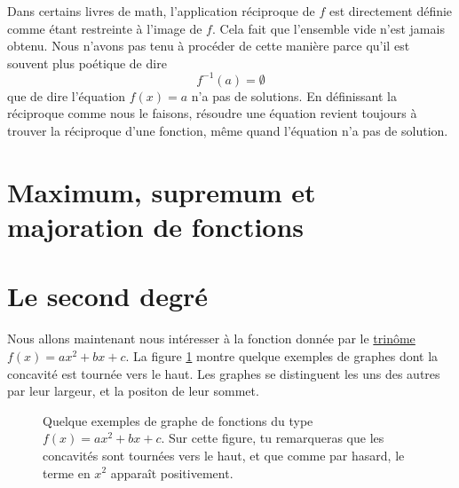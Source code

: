 \begin{remark}
Dans certains livres de math, l'application réciproque de $f$ est directement définie comme étant restreinte à l'image de $f$. Cela fait que l'ensemble vide n'est jamais obtenu. Nous n'avons pas tenu à procéder de cette manière parce qu'il est souvent plus poétique de dire 
\[ 
  f^{-1}(a)=\emptyset
\]
que de dire \og l'équation $f(x)=a$ n'a pas de solutions\fg. En définissant la réciproque comme nous le faisons, résoudre une équation revient toujours à trouver la réciproque d'une fonction, même quand l'équation n'a pas de solution.
\end{remark}


\section{Maximum, supremum et majoration de fonctions}

\section{Le second degré}

Nous allons maintenant nous intéresser à la fonction donnée par le \href{http://fr.wikiversity.org/wiki/Cours_de_mathématiques_de_première_STI/Fonctions_polynômes_du_second_degré_(ou_trinômes)}{trinôme} $f(x)=ax^2+bx+c$. La figure \ref{figExposi} montre quelque exemples de graphes dont la concavité est tournée vers le haut. Les graphes se distinguent les uns des autres par leur largeur, et la positon de leur sommet.

\begin{figure}[ht]
\centering
{}
%
%
\caption{Quelque exemples de graphe de fonctions du type $f(x)=ax^2+bx+c$. Sur cette figure, tu remarqueras que les concavités sont tournées vers le haut, et que comme par hasard, le terme en $x^2$ apparaît positivement.}\label{figExposi}
\end{figure}


